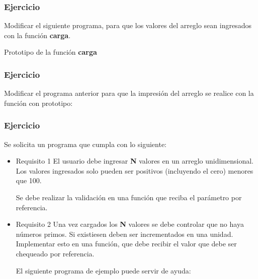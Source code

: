 \subsubsection{Ejercicio}
Modificar el siguiente programa, para que los valores del arreglo sean ingresados con la función \textbf{carga}.
\lstset{inputencoding=utf8/latin1}

Prototipo de la función \textbf{carga}
\lstset{inputencoding=utf8/latin1}


\subsubsection{Ejercicio}
Modificar el programa anterior para que la impresión del arreglo se realice con la función con prototipo:
\lstset{inputencoding=utf8/latin1}


\subsubsection{Ejercicio}
Se solicita un programa que cumpla con lo siguiente:
\begin{itemize}[a)]
  \item Requisito 1
    El usuario debe ingresar \textbf{N} valores en un arreglo unidimensional. Los valores ingresados solo pueden ser positivos (incluyendo el cero) menores que 100.

    Se debe realizar la validación en una función que reciba el parámetro por referencia.

  \item Requisito 2
    Una vez cargados los \textbf{N} valores se debe controlar que no haya números primos. Si existiesen deben ser incrementados en una unidad. Implementar esto en una función,
    que debe recibir el valor que debe ser chequeado por referencia.

    El siguiente programa de ejemplo puede servir de ayuda:

    \lstset{inputencoding=utf8/latin1}
    
\end{itemize}

